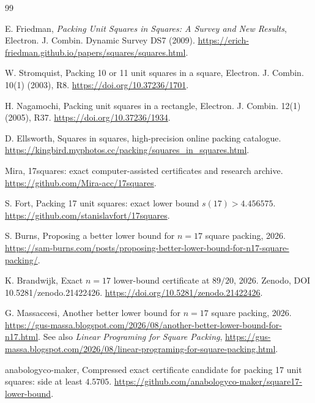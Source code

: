 \documentclass[11pt]{article}
\begin{document}
\clearpage
\begin{thebibliography}{99}

E. Friedman,
\newblock \emph{Packing Unit Squares in Squares: A Survey and New Results},
\newblock Electron. J. Combin. Dynamic Survey DS7 (2009).
\newblock \url{https://erich-friedman.github.io/papers/squares/squares.html}.

W. Stromquist,
\newblock Packing 10 or 11 unit squares in a square,
\newblock Electron. J. Combin. 10(1) (2003), R8.
\newblock \url{https://doi.org/10.37236/1701}.

H. Nagamochi,
\newblock Packing unit squares in a rectangle,
\newblock Electron. J. Combin. 12(1) (2005), R37.
\newblock \url{https://doi.org/10.37236/1934}.

D. Ellsworth,
\newblock Squares in squares, high-precision online packing catalogue.
\newblock \url{https://kingbird.myphotos.cc/packing/squares_in_squares.html}.

Mira,
\newblock 17squares: exact computer-assisted certificates and research archive.
\newblock \url{https://github.com/Mira-acc/17squares}.

S. Fort,
\newblock Packing 17 unit squares: exact lower bound $s(17)>4.456575$.
\newblock \url{https://github.com/stanislavfort/17squares}.

S. Burns,
\newblock Proposing a better lower bound for $n=17$ square packing, 2026.
\newblock \url{https://sam-burns.com/posts/proposing-better-lower-bound-for-n17-square-packing/}.

K. Brandwijk,
\newblock Exact $n=17$ lower-bound certificate at $89/20$, 2026.
\newblock Zenodo, DOI 10.5281/zenodo.21422426.
\newblock \url{https://doi.org/10.5281/zenodo.21422426}.

G. Massaccesi,
\newblock Another better lower bound for $n=17$ square packing, 2026.
\newblock \url{https://gus-massa.blogspot.com/2026/08/another-better-lower-bound-for-n17.html}.
\newblock See also \emph{Linear Programing for Square Packing},
\url{https://gus-massa.blogspot.com/2026/08/linear-programing-for-square-packing.html}.

anabologyco-maker,
\newblock Compressed exact certificate candidate for packing 17 unit squares: side at least $4.5705$.
\newblock \url{https://github.com/anabologyco-maker/square17-lower-bound}.


\end{thebibliography}
\end{document}
